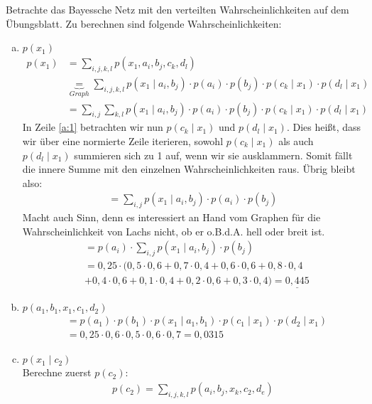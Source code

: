 \begin{aufgabe}
\end{aufgabe}
\begin{aufgabe}
\end{aufgabe}
Betrachte das Bayessche Netz mit den verteilten Wahrscheinlichkeiten auf dem Übungsblatt. Zu berechnen sind folgende Wahrscheinlichkeiten:
\begin{enumerate}[a)]
	\item $p(x_1)$
	\begin{align}
		p(x_1) &= \sum_{i,j,k,l} p(x_1,a_i,b_j,c_k,d_l)\\
		&\underbrace{=}_{Graph} \sum_{i,j,k,l} p(x_1\mid a_i,b_j)\cdot p(a_i)\cdot p(b_j) \cdot p(c_k\mid x_1) \cdot p(d_l\mid x_1)\\
	    &= \sum_{i,j} \sum_{k,l} p(x_1\mid a_i,b_j)\cdot p(a_i)\cdot p(b_j) \cdot p(c_k\mid x_1) \cdot p(d_l\mid x_1)\label{a:1}
	\end{align}
	In Zeile \ref{a:1} betrachten wir nun $p(c_k\mid x_1)$ und $p(d_l\mid x_1)$. Dies heißt, dass wir über eine normierte Zeile iterieren, sowohl $p(c_k\mid x_1)$ als auch $p(d_l\mid x_1)$ summieren sich zu 1 auf, wenn wir sie ausklammern. Somit fällt die innere Summe mit den einzelnen Wahrscheinlichkeiten raus. Übrig bleibt also:
	\begin{align}
	= \sum_{i,j} p(x_1\mid a_i,b_j)\cdot p(a_i)\cdot p(b_j)
	\end{align}
	Macht auch Sinn, denn es interessiert an Hand vom Graphen für die Wahrscheinlichkeit von Lachs nicht, ob er o.B.d.A. hell oder breit ist.
	\begin{align}
	&= p(a_i) \cdot \sum_{i,j} p(x_1\mid a_i,b_j) \cdot p(b_j)\\
	&= 0,25 \cdot (0,5 \cdot 0,6 + 0,7\cdot 0,4 + 0,6\cdot 0,6 + 0,8\cdot 0,4 \\
	&+ 0,4\cdot 0,6 + 0,1\cdot 0,4 + 0,2\cdot 0,6 + 0,3\cdot 0,4) = \underline{0,445}
	\end{align}
	\item $p(a_1,b_1,x_1,c_1,d_2)$
	\begin{align*}
	&= p(a_1) \cdot p(b_1) \cdot p(x_1\mid a_1,b_1) \cdot p(c_1\mid x_1) \cdot p(d_2\mid x_1)\\
	&= 0,25 \cdot 0,6 \cdot 0,5 \cdot 0,6 \cdot 0,7 = 0,0315
	\end{align*}
	\item $p(x_1\mid c_2)$\\
	Berechne zuerst $p(c_2)$:
	\begin{align*}
		p(c_2) = \sum_{i,j,k,l} p(a_i,b_j,x_k,c_2,d_e)\\

\end{align*}
\end{enumerate}
